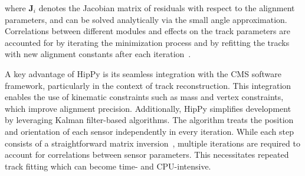 where \(\mathbf{J}_i\) denotes the Jacobian matrix of residuals with respect to the alignment parameters, and can be solved analytically via the small angle approximation. Correlations between different modules and effects on the track parameters are accounted for by iterating the minimization process and by refitting the tracks with new alignment constants after each iteration~\cite{WAdam_2009}. 

A key advantage of HipPy is its seamless integration with the CMS software framework, particularly in the context of track reconstruction. This integration enables the use of kinematic constraints such as mass and vertex constraints, which improve alignment precision. Additionally, HipPy simplifies development by leveraging Kalman filter-based algorithms. The algorithm treats the position and orientation of each sensor independently in every iteration. While each step consists of a straightforward matrix inversion~\cite{WAdam_2009, Karimaki:926537}, multiple iterations are required to account for correlations between sensor parameters. This necessitates repeated track fitting which can become time- and CPU-intensive. 





